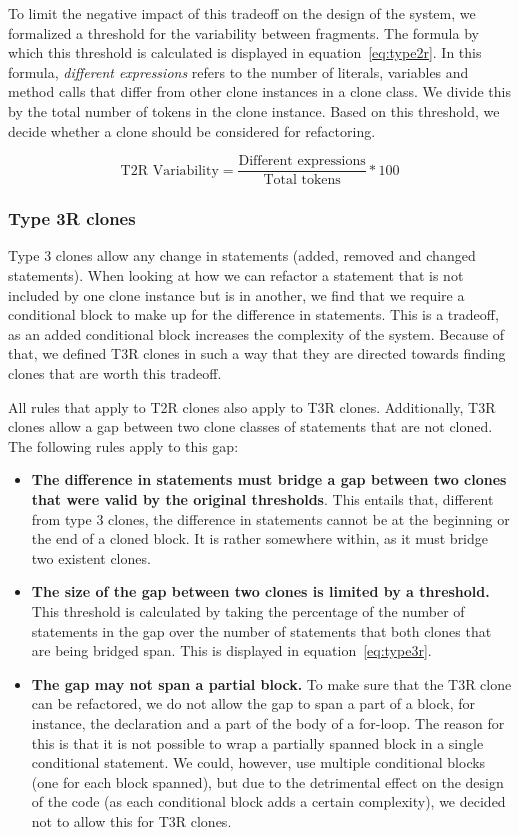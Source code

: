 \documentclass[a4paper]{article}
\begin{document}
To limit the negative impact of this tradeoff on the design of the system, we formalized a threshold for the variability between fragments. The formula by which this threshold is calculated is displayed in equation~\ref{eq:type2r}. In this formula, \textit{different expressions} refers to the number of literals, variables and method calls that differ from other clone instances in a clone class. We divide this by the total number of tokens in the clone instance. Based on this threshold, we decide whether a clone should be considered for refactoring.

\begin{equation}\label{eq:type2r}
\text{T2R Variability}=\frac{\text{Different expressions}}{\text{Total tokens}}*100
\end{equation}

\subsubsection{Type 3R clones}\label{sec:type3r}
Type 3 clones allow any change in statements (added, removed and changed statements). When looking at how we can refactor a statement that is not included by one clone instance but is in another, we find that we require a conditional block to make up for the difference in statements. This is a tradeoff, as an added conditional block increases the complexity of the system. Because of that, we defined T3R clones in such a way that they are directed towards finding clones that are worth this tradeoff.

All rules that apply to T2R clones also apply to T3R clones. Additionally, T3R clones allow a gap between two clone classes of statements that are not cloned. The following rules apply to this gap:

\begin{itemize}
  \item \textbf{The difference in statements must bridge a gap between two clones that were valid by the original thresholds}. This entails that, different from type 3 clones, the difference in statements cannot be at the beginning or the end of a cloned block. It is rather somewhere within, as it must bridge two existent clones.
  \item \textbf{The size of the gap between two clones is limited by a threshold.} This threshold is calculated by taking the percentage of the number of statements in the gap over the number of statements that both clones that are being bridged span. This is displayed in equation~\ref{eq:type3r}.
  \item \textbf{The gap may not span a partial block.} To make sure that the T3R clone can be refactored, we do not allow the gap to span a part of a block, for instance, the declaration and a part of the body of a for-loop. The reason for this is that it is not possible to wrap a partially spanned block in a single conditional statement. We could, however, use multiple conditional blocks (one for each block spanned), but due to the detrimental effect on the design of the code (as each conditional block adds a certain complexity), we decided not to allow this for T3R clones.
\end{itemize}
\end{document}
